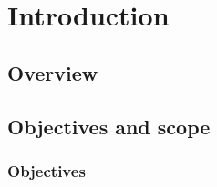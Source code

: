 \chapter{Introduction} \label{Introduction}
\minitoc

\section{Overview}


\section{Objectives and scope}

\subsection{Objectives}




